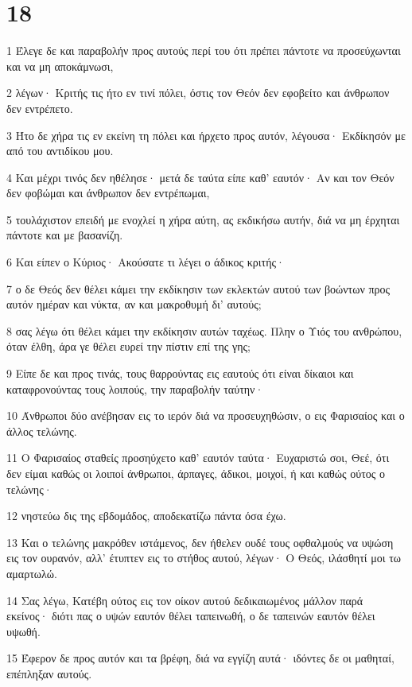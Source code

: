 \chapter{18}

\par 1 Έλεγε δε και παραβολήν προς αυτούς περί του ότι πρέπει πάντοτε να προσεύχωνται και να μη αποκάμνωσι,
\par 2 λέγων· Κριτής τις ήτο εν τινί πόλει, όστις τον Θεόν δεν εφοβείτο και άνθρωπον δεν εντρέπετο.
\par 3 Ήτο δε χήρα τις εν εκείνη τη πόλει και ήρχετο προς αυτόν, λέγουσα· Εκδίκησόν με από του αντιδίκου μου.
\par 4 Και μέχρι τινός δεν ηθέλησε· μετά δε ταύτα είπε καθ' εαυτόν· Αν και τον Θεόν δεν φοβώμαι και άνθρωπον δεν εντρέπωμαι,
\par 5 τουλάχιστον επειδή με ενοχλεί η χήρα αύτη, ας εκδικήσω αυτήν, διά να μη έρχηται πάντοτε και με βασανίζη.
\par 6 Και είπεν ο Κύριος· Ακούσατε τι λέγει ο άδικος κριτής·
\par 7 ο δε Θεός δεν θέλει κάμει την εκδίκησιν των εκλεκτών αυτού των βοώντων προς αυτόν ημέραν και νύκτα, αν και μακροθυμή δι' αυτούς;
\par 8 σας λέγω ότι θέλει κάμει την εκδίκησιν αυτών ταχέως. Πλην ο Υιός του ανθρώπου, όταν έλθη, άρα γε θέλει ευρεί την πίστιν επί της γης;
\par 9 Είπε δε και προς τινάς, τους θαρρούντας εις εαυτούς ότι είναι δίκαιοι και καταφρονούντας τους λοιπούς, την παραβολήν ταύτην·
\par 10 Άνθρωποι δύο ανέβησαν εις το ιερόν διά να προσευχηθώσιν, ο εις Φαρισαίος και ο άλλος τελώνης.
\par 11 Ο Φαρισαίος σταθείς προσηύχετο καθ' εαυτόν ταύτα· Ευχαριστώ σοι, Θεέ, ότι δεν είμαι καθώς οι λοιποί άνθρωποι, άρπαγες, άδικοι, μοιχοί, ή και καθώς ούτος ο τελώνης·
\par 12 νηστεύω δις της εβδομάδος, αποδεκατίζω πάντα όσα έχω.
\par 13 Και ο τελώνης μακρόθεν ιστάμενος, δεν ήθελεν ουδέ τους οφθαλμούς να υψώση εις τον ουρανόν, αλλ' έτυπτεν εις το στήθος αυτού, λέγων· Ο Θεός, ιλάσθητί μοι τω αμαρτωλώ.
\par 14 Σας λέγω, Κατέβη ούτος εις τον οίκον αυτού δεδικαιωμένος μάλλον παρά εκείνος· διότι πας ο υψών εαυτόν θέλει ταπεινωθή, ο δε ταπεινών εαυτόν θέλει υψωθή.
\par 15 Έφερον δε προς αυτόν και τα βρέφη, διά να εγγίζη αυτά· ιδόντες δε οι μαθηταί, επέπληξαν αυτούς.
